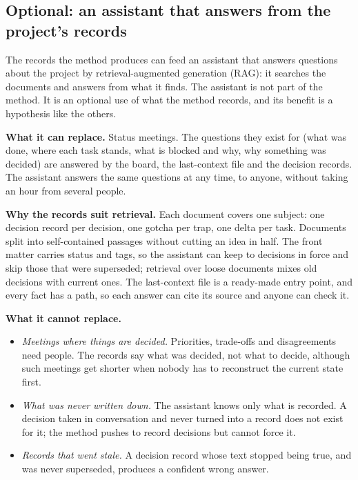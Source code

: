 \documentclass[11pt,a4paper]{article}
\begin{document}
\subsection{Optional: an assistant that answers from the project's records}
\label{sec:rag}

The records the method produces can feed an assistant that answers questions about the project by retrieval-augmented generation (RAG): it searches the documents and answers from what it finds. The assistant is not part of the method. It is an optional use of what the method records, and its benefit is a hypothesis like the others.

\textbf{What it can replace.} Status meetings. The questions they exist for (what was done, where each task stands, what is blocked and why, why something was decided) are answered by the board, the last-context file and the decision records. The assistant answers the same questions at any time, to anyone, without taking an hour from several people.

\textbf{Why the records suit retrieval.} Each document covers one subject: one decision record per decision, one gotcha per trap, one delta per task. Documents split into self-contained passages without cutting an idea in half. The front matter carries status and tags, so the assistant can keep to decisions in force and skip those that were superseded; retrieval over loose documents mixes old decisions with current ones. The last-context file is a ready-made entry point, and every fact has a path, so each answer can cite its source and anyone can check it.

\textbf{What it cannot replace.}
\begin{itemize}
  \item \emph{Meetings where things are decided.} Priorities, trade-offs and disagreements need people. The records say what was decided, not what to decide, although such meetings get shorter when nobody has to reconstruct the current state first.
  \item \emph{What was never written down.} The assistant knows only what is recorded. A decision taken in conversation and never turned into a record does not exist for it; the method pushes to record decisions but cannot force it.
  \item \emph{Records that went stale.} A decision record whose text stopped being true, and was never superseded, produces a confident wrong answer.
\end{itemize}
\end{document}
